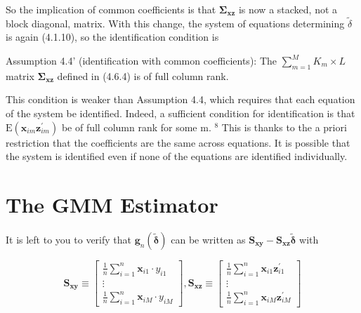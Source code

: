 \documentclass[10pt]{article}
\begin{document}
So the implication of common coefficients is that $\boldsymbol{\Sigma}_{\mathbf{x z}}$ is now a stacked, not a block diagonal, matrix. With this change, the system of equations determining $\tilde{\delta}$ is again (4.1.10), so the identification condition is

Assumption 4.4' (identification with common coefficients): The $\sum_{m=1}^{M} K_{m} \times L$ matrix $\boldsymbol{\Sigma}_{\mathbf{x z}}$ defined in (4.6.4) is of full column rank.

This condition is weaker than Assumption 4.4, which requires that each equation of the system be identified. Indeed, a sufficient condition for identification is that $\mathrm{E}\left(\mathbf{x}_{i m} \mathbf{z}_{i m}^{\prime}\right)$ be of full column rank for some m. ${ }^{8}$ This is thanks to the a priori restriction that the coefficients are the same across equations. It is possible that the system is identified even if none of the equations are identified individually.

\section*{The GMM Estimator}
It is left to you to verify that $\mathbf{g}_{n}(\tilde{\boldsymbol{\delta}})$ can be written as $\mathbf{S}_{\mathbf{x y}}-\mathbf{S}_{\mathbf{x z}} \tilde{\boldsymbol{\delta}}$ with

\[
\mathbf{S}_{\mathbf{x y}} \equiv\left[\begin{array}{c}
\frac{1}{n} \sum_{i=1}^{n} \mathbf{x}_{i 1} \cdot y_{i 1}  \tag{4.6.5}\\
\vdots \\
\frac{1}{n} \sum_{i=1}^{n} \mathbf{x}_{i M} \cdot y_{i M}
\end{array}\right], \mathbf{S}_{\mathbf{x z}} \equiv\left[\begin{array}{c}
\frac{1}{n} \sum_{i=1}^{n} \mathbf{x}_{i 1} \mathbf{z}_{i 1}^{\prime} \\
\vdots \\
\frac{1}{n} \sum_{i=1}^{n} \mathbf{x}_{i M} \mathbf{z}_{i M}^{\prime}
\end{array}\right]
\]
\end{document}
